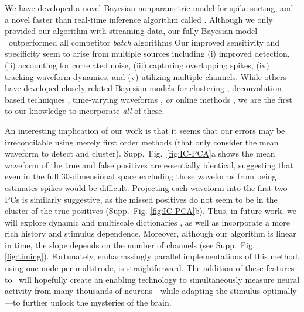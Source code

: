 

We have developed a novel Bayesian nonparametric model for spike sorting, and a novel faster than real-time  inference algorithm called \smug.  
Although we only provided our algorithm with streaming data, our fully Bayesian model \smug\ outperformed all competitor \emph{batch} algorithms 
Our improved sensitivity and specificity seem to arise from multiple sources including (i) improved detection, (ii) accounting for correlated noise, 
(iii) capturing overlapping spikes, (iv) tracking waveform dynamics, and (v) utilizing multiple channels.  
While others have developed closely related Bayesian models for clustering \cite{WoodBla2008,wood2009}, deconvolution based techniques \cite{Pillow2013}, time-varying waveforms \cite{calabrese2011kalman},  \emph{or} online methods \cite{OSORT, Franke2010}, we are the first to our knowledge to incorporate \emph{all} of these.

An interesting implication of our work is that it seems that our errors may be irreconcilable using merely first order methods (that 
only consider the mean waveform to detect and cluster).  Supp.\ Fig.\ \ref{fig:IC-PCA}a shows the mean waveform 
of the true and false positives are essentially identical, suggesting that even in the full 30-dimensional space excluding those waveforms from being 
estimates spikes would be difficult.  
Projecting each waveform into the first two PCs is similarly suggestive,
as the missed positives do not seem to be in the cluster of the true positives (Supp.\ Fig. \ref{fig:IC-PCA}b). 
Thus, in future work, we will explore dynamic and multiscale dictionaries \cite{ChenMaggioni12}, 
as well as incorporate a more rich history and stimulus dependence.  
Moreover, although our algorithm is linear in time, the slope depends on the number of channels (see Supp.\ Fig. \ref{fig:timing}).  
Fortunately, embarrassingly parallel implementations of this method, using one node per multitrode, is straightforward.  
The addition of these features to \smug\ will hopefully create an enabling technology to  simultaneously measure neural activity from many thousands of neurons---while adapting the stimulus optimally---to further unlock the mysteries of the brain.
